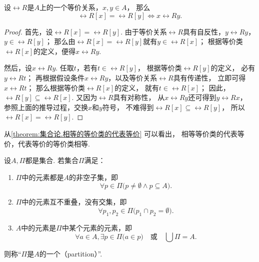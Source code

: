 \begin{lemma}\label{theorem:集合论.相等的等价类的代表等价}
设\(\rel{R}\)是\(A\)上的一个等价关系，\(x,y \in A\)，
那么\[
	\rel{R}[x] = \rel{R}[y]
	\iff
	x \rel{R} y.
\]
\begin{proof}
首先，设\(\rel{R}[x] = \rel{R}[y]\).
由于等价关系\(\rel{R}\)具有自反性，\(y \rel{R} y\)，\(y \in \rel{R}[y]\)；
那么由\(\rel{R}[x] = \rel{R}[y]\)就有\(y \in \rel{R}[x]\)；
根据等价类\(\rel{R}[x]\)的定义，便得\(x \rel{R} y\).

然后，设\(x \rel{R} y\).
任取\(t\)，若有\(t \in \rel{R}[y]\)，
根据等价类\(\rel{R}[y]\)的定义，
必有\(y \rel{R} t\)；
再根据假设条件\(x \rel{R} y\)，以及等价关系\(\rel{R}\)具有传递性，
立即可得\(x \rel{R} t\)；
那么根据等价类\(\rel{R}[x]\)的定义，
就有\(t \in \rel{R}[x]\)；
因此，\(\rel{R}[y] \subseteq \rel{R}[x]\).
又因为\(\rel{R}\)具有对称性，
从\(x \rel{R} y\)还可得到\(y \rel{R} x\)，
参照上面的推导过程，交换\(x\)和\(y\)符号，
不难得到\(\rel{R}[x] \subseteq \rel{R}[y]\)，
所以\(\rel{R}[x] = \rel{R}[y]\).
\end{proof}
\end{lemma}
从\cref{theorem:集合论.相等的等价类的代表等价} 可以看出，
相等等价类的代表等价，代表等价的等价类相等.

\begin{definition}\label{definition:集合论.划分的定义}
设\(A,\Pi\)都是集合.
若集合\(\Pi\)满足：
\begin{enumerate}
	\item \(\Pi\)中的元素都是\(A\)的非空子集，即\[
		\forall p \in \Pi \bigl(
			p \neq \emptyset
			\land
			p \subseteq A
		\bigr).
	\]

	\item \(\Pi\)中的元素互不重叠，没有交集，即\[
		\forall p_1,p_2 \in \Pi \bigl(
			p_1 \cap p_2 = \emptyset
		\bigr).
	\]

	\item \(A\)中的元素是\(\Pi\)中某个元素的元素，即\[
		\forall a \in A, \exists p \in \Pi \bigl(
			a \in p
		\bigr)
		\quad\text{或}\quad
		\bigcup\Pi = A.
	\]
\end{enumerate}
则称“\(\Pi\)是\(A\)的一个（partition）”.
\end{definition}

